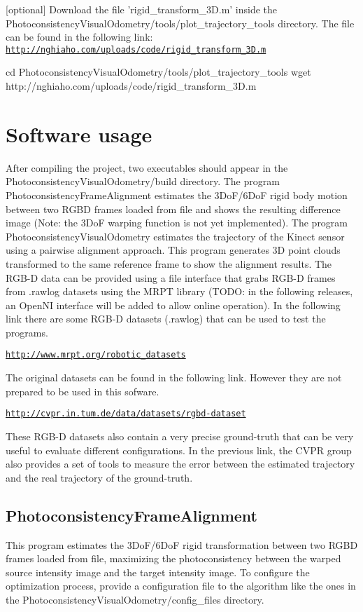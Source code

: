 \begin{DoxyItemize}
\item \mbox{[}optional\mbox{]} Download the file 'rigid\_\-transform\_\-3D.m' inside the PhotoconsistencyVisualOdometry/tools/plot\_\-trajectory\_\-tools directory. The file can be found in the following link: \href{http://nghiaho.com/uploads/code/rigid_transform_3D.m}{\tt http://nghiaho.com/uploads/code/rigid\_\-transform\_\-3D.m} \begin{DoxyVerb}
cd PhotoconsistencyVisualOdometry/tools/plot_trajectory_tools
wget http://nghiaho.com/uploads/code/rigid_transform_3D.m
\end{DoxyVerb}

\end{DoxyItemize}\hypertarget{index_usage_sec}{}\section{Software usage}\label{index_usage_sec}
After compiling the project, two executables should appear in the PhotoconsistencyVisualOdometry/build directory. The program PhotoconsistencyFrameAlignment estimates the 3DoF/6DoF rigid body motion between two RGBD frames loaded from file and shows the resulting difference image (Note: the 3DoF warping function is not yet implemented). The program PhotoconsistencyVisualOdometry estimates the trajectory of the Kinect sensor using a pairwise alignment approach. This program generates 3D point clouds transformed to the same reference frame to show the alignment results. The RGB-\/D data can be provided using a file interface that grabs RGB-\/D frames from .rawlog datasets using the MRPT library (TODO: in the following releases, an OpenNI interface will be added to allow online operation). In the following link there are some RGB-\/D datasets (.rawlog) that can be used to test the programs.

\href{http://www.mrpt.org/robotic_datasets}{\tt http://www.mrpt.org/robotic\_\-datasets}

The original datasets can be found in the following link. However they are not prepared to be used in this sofware.

\href{http://cvpr.in.tum.de/data/datasets/rgbd-dataset}{\tt http://cvpr.in.tum.de/data/datasets/rgbd-\/dataset}

These RGB-\/D datasets also contain a very precise ground-\/truth that can be very useful to evaluate different configurations. In the previous link, the CVPR group also provides a set of tools to measure the error between the estimated trajectory and the real trajectory of the ground-\/truth.\hypertarget{index_PhotoconsistencyFrameAlignment}{}\subsection{PhotoconsistencyFrameAlignment}\label{index_PhotoconsistencyFrameAlignment}
This program estimates the 3DoF/6DoF rigid transformation between two RGBD frames loaded from file, maximizing the photoconsistency between the warped source intensity image and the target intensity image. To configure the optimization process, provide a configuration file to the algorithm like the ones in the PhotoconsistencyVisualOdometry/config\_\-files directory.

